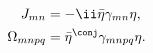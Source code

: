 \begin{equation}
\begin{aligned}
   J_{mn} &= -\ii\bar{\eta}\gamma_{mn}\eta , \\
   \Omega_{mnpq} &= \bar{\eta}^\conj\gamma_{mnpq}\eta .
\end{aligned}
\end{equation}

